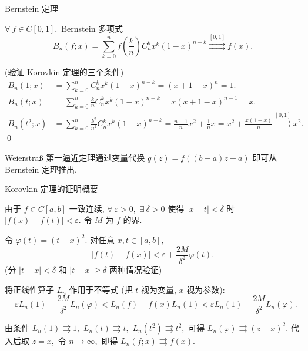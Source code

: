 
\begin{frame}{Bernstein 定理}

\begin{thm}[Bernstein 定理]
$\forall~f \in C[0, 1],$ Bernstein 多项式
\[B_n(f; x) = \sum_{k=0}^n f\left( \frac{k}{n} \right) C_n^k x^k (1-x)^{n-k} \stackrel{[0, 1]}{\rightrightarrows} f(x).\]
\end{thm}

\pause

\startproof[bg=yellow, fg=red](验证 Korovkin 定理的三个条件)
{\smaller[1]
\begin{align*}
B_n(1; x) & = \sum_{k=0}^n C_n^k x^k (1-x)^{n-k} = (x + 1 - x)^n = 1. \\[0.5em]
B_n(t; x) & = \sum_{k=0}^n \frac{k}{n} C_n^k x^k (1-x)^{n-k} = x (x+1-x)^{n-1} = x. \\[0.5em]
B_n(t^2; x) & = \sum_{k=0}^n \frac{k^2}{n^2} C_n^k x^k (1-x)^{n-k} = \frac{n-1}{n} x^2 + \frac{1}{n} x = x^2 + \frac{x(1-x)}{n} \stackrel{[0,1]}{\rightrightarrows} x^2.
\end{align*}
}
\qed

\pause

Weierstraß 第一逼近定理通过变量代换 $g(z) = f((b-a)z + a)$ 即可从 Bernstein 定理推出.

\end{frame}


\begin{frame}{Korovkin 定理的证明概要}

由于 $f \in C[a, b]$ 一致连续, $\forall~\varepsilon > 0,$ $\exists~\delta > 0$ 使得 $|x-t| < \delta$ 时 $|f(x) - f(t)| < \varepsilon.$ 令 $M$ 为 $f$ 的界.

\pause
\vspace{0.5em}

令 $\varphi(t) = (t-x)^2.$ 对任意 $x, t \in [a,b],$
\[|f(t) - f(x)| < \varepsilon + \frac{2M}{\delta^2} \varphi(t).\]
(分 $|t-x| < \delta$ 和 $|t-x| \geqslant \delta$ 两种情况验证)

\pause
\vspace{0.5em}

将正线性算子 $L_n$ 作用于不等式 (把 $t$ 视为变量, $x$ 视为参数):
\[-\varepsilon L_n(1) - \frac{2M}{\delta^2} L_n(\varphi) < L_n(f) - f(x) L_n(1) < \varepsilon L_n(1) + \frac{2M}{\delta^2} L_n(\varphi).\]

\pause
\vspace{0.5em}

由条件 $L_n(1) \rightrightarrows 1,$ $L_n(t) \rightrightarrows t,$ $L_n(t^2) \rightrightarrows t^2,$ 可得
$L_n(\varphi) \rightrightarrows (z-x)^2.$ 代入后取 $z = x,$ 令 $n \to \infty,$ 即得 $L_n(f; x) \rightrightarrows f(x).$

\end{frame}

